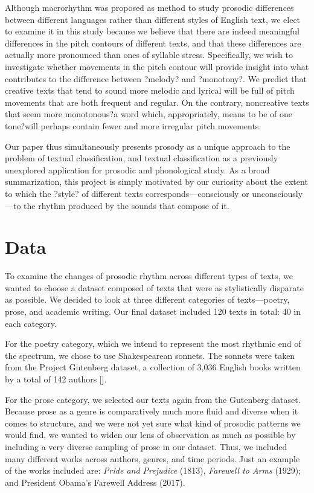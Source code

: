 \documentclass[pageno]{jpaper}
\begin{document}
Although macrorhythm was proposed as method to study prosodic differences between different languages rather than different styles of English text, we elect to examine it in this study because we believe that there are indeed meaningful differences in the pitch contours of different texts, and that these differences are actually more pronounced than ones of syllable stress. Specifically, we wish to investigate whether movements in the pitch contour will provide insight into what contributes to the difference between ?melody? and ?monotony?. We predict that creative texts that tend to sound more melodic and lyrical will be full of pitch movements that are both frequent and regular. On the contrary, noncreative texts that seem more monotonous?a word which, appropriately, means to be of one tone?will perhaps contain fewer and more irregular pitch movements. 

Our paper thus simultaneously presents prosody as a unique approach to the problem of textual classification, and textual classification as a previously unexplored application for prosodic and phonological study. As a broad summarization, this project is simply motivated by our curiosity about the extent to which the ?style? of different texts corresponds---consciously or unconsciously---to the rhythm produced by the sounds that compose of it.  



\section{Data}
To examine the changes of prosodic rhythm across different types of texts, we wanted to choose a dataset composed of texts that were as stylistically disparate as possible. We decided to look at three different categories of texts---poetry, prose, and academic writing. Our final dataset included 120 texts in total: 40 in each category. 

For the poetry category, which we intend to represent the most rhythmic end of the spectrum, we chose to use Shakespearean sonnets. The sonnets were taken from the Project Gutenberg dataset, a collection of 3,036 English books written by a total of 142 authors []. 

For the prose category, we selected our texts again from the Gutenberg dataset. Because prose as a genre is comparatively much more fluid and diverse when it comes to structure, and we were not yet sure what kind of prosodic patterns we would find, we wanted to widen our lens of observation as much as possible by including a very diverse sampling of prose in our dataset. Thus, we included many different works across authors, genres, and time periods. Just an example of the works included are: \textit{Pride and Prejudice} (1813), \textit{Farewell to Arms} (1929); and President Obama's Farewell Address (2017). 
\end{document}
